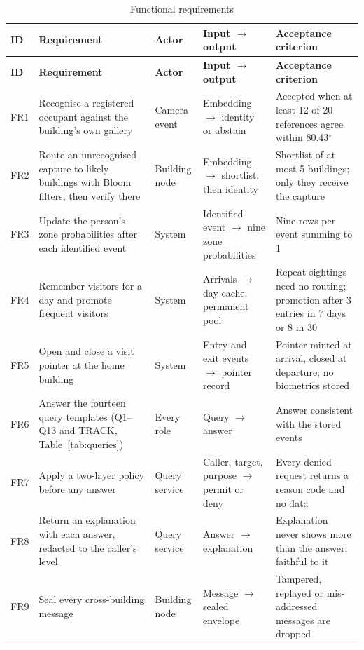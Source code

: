 \documentclass[12pt,a4paper,oneside]{report}
\begin{document}
{\small\setlength{\tabcolsep}{4pt}\renewcommand{\arraystretch}{1.2}
\begin{longtable}{|p{0.93cm}|p{3.75cm}|p{1.87cm}|p{3.19cm}|p{3.94cm}|}
\caption{Functional requirements}\label{tab:fr}\\\hline
\textbf{ID} & \textbf{Requirement} & \textbf{Actor} & \textbf{Input $\rightarrow$ output} & \textbf{Acceptance criterion}\\\hline\endfirsthead
\hline\textbf{ID} & \textbf{Requirement} & \textbf{Actor} & \textbf{Input $\rightarrow$ output} & \textbf{Acceptance criterion}\\\hline\endhead
FR1 & Recognise a registered occupant against the building's own gallery & Camera event & Embedding $\rightarrow$ identity or abstain & Accepted when at least 12 of 20 references agree within 80.43$^{\circ}$\\\hline
FR2 & Route an unrecognised capture to likely buildings with Bloom filters, then verify there & Building node & Embedding $\rightarrow$ shortlist, then identity & Shortlist of at most 5 buildings; only they receive the capture\\\hline
FR3 & Update the person's zone probabilities after each identified event & System & Identified event $\rightarrow$ nine zone probabilities & Nine rows per event summing to 1\\\hline
FR4 & Remember visitors for a day and promote frequent visitors & System & Arrivals $\rightarrow$ day cache, permanent pool & Repeat sightings need no routing; promotion after 3 entries in 7 days or 8 in 30\\\hline
FR5 & Open and close a visit pointer at the home building & System & Entry and exit events $\rightarrow$ pointer record & Pointer minted at arrival, closed at departure; no biometrics stored\\\hline
FR6 & Answer the fourteen query templates (Q1--Q13 and TRACK, Table~\ref{tab:queries}) & Every role & Query $\rightarrow$ answer & Answer consistent with the stored events\\\hline
FR7 & Apply a two-layer policy before any answer & Query service & Caller, target, purpose $\rightarrow$ permit or deny & Every denied request returns a reason code and no data\\\hline
FR8 & Return an explanation with each answer, redacted to the caller's level & Query service & Answer $\rightarrow$ explanation & Explanation never shows more than the answer; faithful to it\\\hline
FR9 & Seal every cross-building message & Building node & Message $\rightarrow$ sealed envelope & Tampered, replayed or mis-addressed messages are dropped\\\hline

\end{longtable}}
\end{document}

